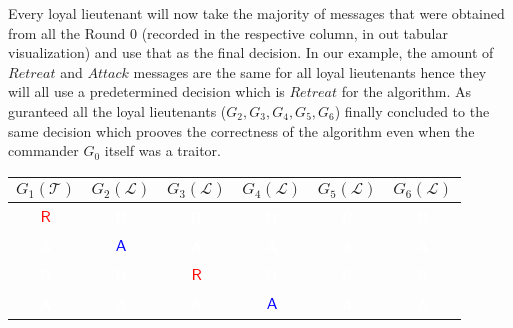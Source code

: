 \documentclass[11pt]{article}
\newcommand{\cmdA}{\ensuremath{\mathsf{A}}} %
\newcommand{\cmdR}{\ensuremath{\mathsf{R}}} %
\newcommand{\loyal}{\ensuremath{\mathcal{L}}}
\newcommand{\traitor}{\ensuremath{\mathcal{T}}}
\newcommand{\gen}[1]{\ensuremath{G_{#1}}}
\begin{document}
Every loyal lieutenant will now take the majority of messages that were obtained from all the Round 0 (recorded in the respective column, in out tabular visualization) and use that as the final decision. In our example, the amount of $Retreat$ and $Attack$ messages are the same for all loyal lieutenants hence they will all use a predetermined decision which is $Retreat$ for the algorithm. As guranteed all the loyal lieutenants ($\gen{2}, \gen{3}, \gen{4}, \gen{5}, \gen{6}$) finally concluded to the same decision which prooves the correctness of the algorithm even when the commander $\gen{0}$ itself was a traitor.

\begin{center}
\vspace{1em} %
\renewcommand{\arraystretch}{1.5}
\setlength{\tabcolsep}{6pt} %
\begin{tabular}{c|c|c|c|c|c}
    \hline
    \textbf{$\gen{1}(\traitor)$} & \textbf{$\gen{2}(\loyal)$} & \textbf{$\gen{3}(\loyal)$} & \textbf{$\gen{4}(\loyal)$} & \textbf{$\gen{5}(\loyal)$} & \textbf{$\gen{6}(\loyal)$} \\
    \hline
    \cellcolor{yellow!30}\textbf{\textcolor{red}{\cmdR}} & \cellcolor{red!75}\textbf{\textcolor{white}{R}} & \cellcolor{red!75}\textbf{\textcolor{white}{R}} & \cellcolor{red!75}\textbf{\textcolor{white}{R}} & \cellcolor{red!75}\textbf{\textcolor{white}{R}} & \cellcolor{red!75}\textbf{\textcolor{white}{R}} \\
    \hline
    \cellcolor{blue!75}\textbf{\textcolor{white}{A}} & \cellcolor{yellow!30}\textbf{\textcolor{blue}{\cmdA}} & \cellcolor{blue!75}\textbf{\textcolor{white}{A}} & \cellcolor{blue!75}\textbf{\textcolor{white}{A}} & \cellcolor{blue!75}\textbf{\textcolor{white}{A}} & \cellcolor{blue!75}\textbf{\textcolor{white}{A}} \\
    \hline
    \cellcolor{red!75}\textbf{\textcolor{white}{R}} & \cellcolor{red!75}\textbf{\textcolor{white}{R}} & \cellcolor{yellow!30}\textbf{\textcolor{red}{\cmdR}} & \cellcolor{red!75}\textbf{\textcolor{white}{R}} & \cellcolor{red!75}\textbf{\textcolor{white}{R}} & \cellcolor{red!75}\textbf{\textcolor{white}{R}} \\
    \hline
    \cellcolor{blue!75}\textbf{\textcolor{white}{A}} & \cellcolor{blue!75}\textbf{\textcolor{white}{A}} & \cellcolor{blue!75}\textbf{\textcolor{white}{A}} & \cellcolor{yellow!30}\textbf{\textcolor{blue}{\cmdA}} & \cellcolor{blue!75}\textbf{\textcolor{white}{A}} & \cellcolor{blue!75}\textbf{\textcolor{white}{A}} \\

\end{tabular}
\end{center}
\end{document}
